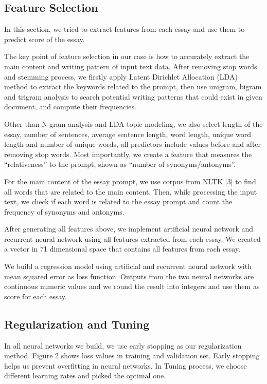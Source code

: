 \documentclass[11pt,conference]{IEEEtran}
\begin{document}
\subsection{Feature Selection}

In this section, we tried to extract features from each essay and use them to predict score of the essay. 

The key point of feature selection in our case is how to accurately extract the main content and writing pattern of input text data. After removing stop words and stemming process, we firstly apply Latent Dirichlet Allocation (LDA) method to extract the keywords related to the prompt, then use unigram, bigram and trigram analysis to search potential writing patterns that could exist in given document, and compute their frequencies. 

Other than N-gram analysis and LDA topic modeling, we also select length of the essay, number of sentences, average sentence length, word length, unique word length and number of unique words, all predictors include values before and after removing stop words. Most importantly, we create a feature that measures the ``relativeness'' to the prompt, shown as ``number of synonyms/antonyms''.

For the main content of the essay prompt, we use corpus from NLTK [3] to find all words that are related to the main content. Then, while processing the input text, we check if each word is related to the essay prompt and count the frequency of synonyms and antonyms. 

After generating all features above, we implement artificial neural network and recurrent neural network using all features extracted from each essay. We created a vector in 71 dimensional space that contains all features from each essay.

We build a regression model using artificial and recurrent neural network with mean squared error as loss function. Outputs from the two neural networks are continuous numeric values and we round the result into integers and use them as score for each essay. 

\subsection{Regularization and Tuning}

In all neural networks we build, we use early stopping as our regularization method. 
Figure 2 shows loss values in training and validation set. Early stopping helps us prevent overfitting in neural networks. In Tuning process, we choose different learning rates and picked the optimal one. 
\end{document}
